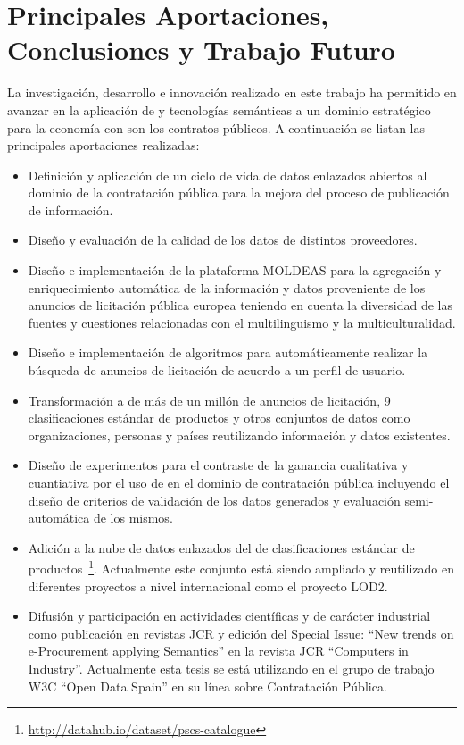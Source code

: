 \documentclass[a4paper,final,11pt,fleqn,twoside]{book}  %
\begin{document}
\chapter{Principales Aportaciones, Conclusiones y Trabajo Futuro}
La investigación, desarrollo e innovación realizado en este trabajo ha permitido en avanzar en la aplicación 
de \linkeddata y tecnologías semánticas a un dominio estratégico para la economía con son los contratos públicos. A 
continuación se listan las principales aportaciones realizadas:
\begin{itemize}
 \item Definición y aplicación de un ciclo de vida de datos enlazados abiertos al dominio 
 de la contratación pública para la mejora del proceso de publicación de información.
 \item Diseño y evaluación de la calidad de los datos de distintos proveedores.
 \item Diseño e implementación de la plataforma MOLDEAS para la agregación y enriquecimiento 
 automática de la información y datos proveniente de los anuncios de licitación pública europea teniendo 
 en cuenta la diversidad de las fuentes y cuestiones relacionadas con el multilinguismo y la multiculturalidad.
 \item Diseño e implementación de algoritmos para automáticamente realizar la búsqueda de anuncios 
 de licitación de acuerdo a un perfil de usuario.
\item Transformación a \linkeddata de más de un millón de anuncios de licitación, 9 clasificaciones estándar de productos 
y otros conjuntos de datos como organizaciones, personas y países reutilizando información y datos existentes.
\item Diseño de experimentos para el contraste de la ganancia cualitativa y cuantiativa por el uso de \lod en el dominio 
de contratación pública incluyendo el diseño de criterios de validación de los datos generados y evaluación semi-automática de los mismos.
\item Adición a la nube de datos enlazados del \dataset de clasificaciones estándar de productos~\footnote{\url{http://datahub.io/dataset/pscs-catalogue}}. Actualmente este conjunto
está siendo ampliado y reutilizado en diferentes proyectos a nivel internacional como el proyecto LOD2.
\item Difusión y participación en actividades científicas y de carácter industrial como publicación 
en revistas JCR y edición del Special Issue: ``New trends on e-Procurement applying Semantics'' en la revista JCR ``Computers in Industry''. 
Actualmente esta tesis se está utilizando en el grupo de trabajo W3C ``Open Data Spain'' en su línea sobre Contratación Pública.
\end{itemize}
\end{document}
